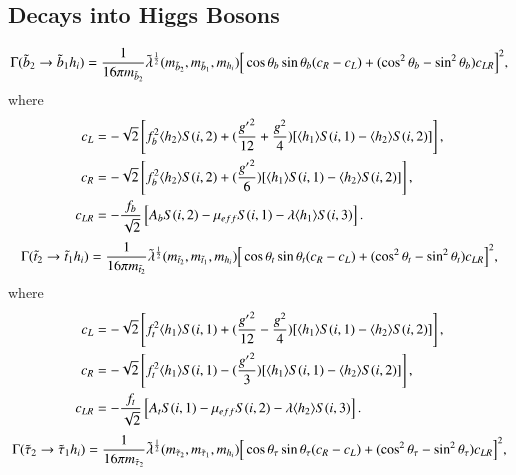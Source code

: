 \documentclass[final,3p,times]{elsarticle}
\begin{document}
\subsection{Decays into Higgs Bosons}
\begin{equation} \label{b2b1hNMSSM}
\Gamma(\tilde{b}_2 \rightarrow \tilde{b}_1 h_{i}) = {1 \over 16 \pi m_{\tilde{b}_2}}\tilde{\lambda}^{1 \over 2}(m_{\tilde{b}_2}, m_{\tilde{b}_1}, m_{h_i})\Big[\cos\theta_b \sin\theta_b (c_R - c_L) + (\cos^2 \theta_b - \sin^2 \theta_b) c_{LR}\Big]^2,
\end{equation}
where
\begin{align}
c_{L} &= -\sqrt{2}\left[f_{b}^2 \langle h_2 \rangle S(i,2) + ({{g'}^2 \over 12} + {g^2 \over 4})[\langle h_1 \rangle S(i,1) - \langle h_{2} \rangle S(i,2)]\right], \\
c_{R} &= -\sqrt{2}\left[f_{b}^2 \langle h_2 \rangle S(i,2) + ({{g'}^2 \over 6})[\langle h_1 \rangle S(i,1) - \langle h_{2} \rangle S(i,2)]\right], \\
c_{LR} &= -{f_{b} \over \sqrt{2}}\left[A_{b}S(i,2) - \mu_{eff}S(i,1)-\lambda \langle h_{1} \rangle S(i,3)\right].
\end{align}
\begin{equation} \label{t2t1hNMSSM}
\Gamma(\tilde{t}_2 \rightarrow \tilde{t}_1 h_{i}) = {1 \over 16 \pi m_{\tilde{t}_2}}\tilde{\lambda}^{1 \over 2}(m_{\tilde{t}_2}, m_{\tilde{t}_1}, m_{h_i})\Big[\cos\theta_t \sin\theta_t (c_R - c_L) + (\cos^2 \theta_t - \sin^2 \theta_t) c_{LR}\Big]^2,
\end{equation}
where
\begin{align}
c_{L} &= -\sqrt{2}\left[f_{t}^2 \langle h_1 \rangle S(i,1) + ({{g'}^2 \over 12} - {g^2 \over 4})[\langle h_1 \rangle S(i,1) - \langle h_{2} \rangle S(i,2)]\right], \\
c_{R} &= -\sqrt{2}\left[f_{t}^2 \langle h_1 \rangle S(i,1) - ({{g'}^2 \over 3})[\langle h_1 \rangle S(i,1) - \langle h_{2} \rangle S(i,2)]\right], \\
c_{LR} &= -{f_{t} \over \sqrt{2}}\left[A_{t}S(i,1) - \mu_{eff}S(i,2)-\lambda \langle h_{2} \rangle S(i,3)\right].
\end{align}
\begin{equation} \label{stau2stau1hNMSSM}
\Gamma(\tilde{\tau}_2 \rightarrow \tilde{\tau}_1 h_{i}) = {1 \over 16 \pi m_{\tilde{\tau}_2}}\tilde{\lambda}^{1 \over 2}(m_{\tilde{\tau}_2}, m_{\tilde{\tau}_1}, m_{h_i})\Big[\cos\theta_{\tau} \sin\theta_{\tau} (c_R - c_L) + (\cos^2 \theta_{\tau} - \sin^2 \theta_{\tau}) c_{LR}\Big]^2,
\end{equation}
\end{document}
